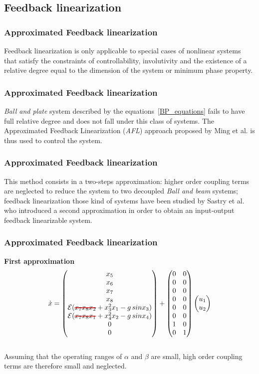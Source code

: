\subsection{Feedback linearization}
\begin{frame}
\frametitle{Approximated Feedback linearization}
Feedback linearization is only applicable to special cases of nonlinear systems that satisfy the constraints of controllability, involutivity and the existence of a relative degree equal to the dimension of the system or minimum phase property.
\end{frame}
%
\begin{frame}
\frametitle{Approximated Feedback linearization}
\textit{Ball and plate} system described by the equations~\ref{BP_equations} fails to have full relative degree and does not fall under this class of systems. The Approximated Feedback Linearization (\textit{AFL}) approach proposed by Ming et al. is thus used to control the system.
\end{frame}
%
\begin{frame}
\frametitle{Approximated Feedback linearization}
This method consists in a two-steps approximation: higher order coupling terms are neglected to reduce the system to two decoupled \textit{Ball and beam} systems; feedback linearization those kind of systems have been studied by Sastry et al.  who introduced a second approximation in order to obtain an input-output feedback linearizable system.
\end{frame}
%
\begin{frame}
\frametitle{Approximated Feedback linearization}
\textbf{First approximation}
\begin{equation}\label{eq:simplified_dynamic}
\dot{x} =%
	\begin{pmatrix}
	x_5\\
	x_6\\
	x_7\\
	x_8\\
	\mathcal{E}(\hcancel[red]{x_7x_8x_2} + x^2_3x_1 - g\,sinx_3)\\
	\mathcal{E}(\hcancel[red]{x_7x_8x_1} + x^2_4x_2 - g\,sinx_4)\\
	0\\
	0\\
	\end{pmatrix}
	+
	\begin{pmatrix}
		0 &0\\
		0 &0\\
		0 &0\\
		0 &0\\
		0 &0\\
		0 &0\\
		1 &0\\
		0 &1\\
	\end{pmatrix}
	\begin{pmatrix}
		u_1\\
	 	u_2
	\end{pmatrix}
\end{equation}\\[10pt]
Assuming that the operating ranges of $\alpha$ and $\beta$ are small, high order coupling terms are therefore small and neglected.
\end{frame}
